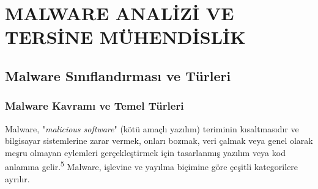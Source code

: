\chapter{MALWARE ANALİZİ VE TERSİNE MÜHENDİSLİK}


\section{Malware Sınıflandırması ve Türleri}

\subsection{Malware Kavramı ve Temel Türleri}

Malware, "\textit{malicious software}" (kötü amaçlı yazılım) teriminin kısaltmasıdır ve bilgisayar sistemlerine zarar vermek, onları bozmak, veri çalmak veya genel olarak meşru olmayan eylemleri gerçekleştirmek için tasarlanmış yazılım veya kod anlamına gelir.\textsuperscript{5} Malware, işlevine ve yayılma biçimine göre çeşitli kategorilere ayrılır.


